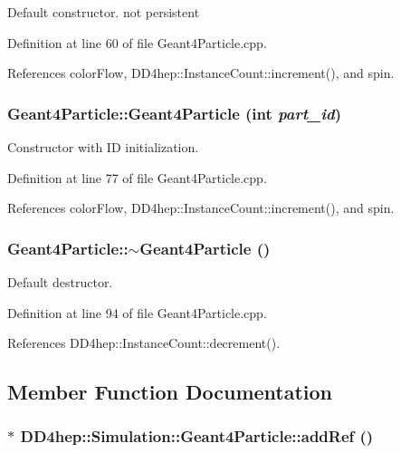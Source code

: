 Default constructor. not persistent 

Definition at line 60 of file Geant4Particle.cpp.

References colorFlow, DD4hep::InstanceCount::increment(), and spin.\hypertarget{class_d_d4hep_1_1_simulation_1_1_geant4_particle_a3fedeb9cf8f88104e7457305164145d8}{
\subsubsection[{Geant4Particle}]{\setlength{\rightskip}{0pt plus 5cm}Geant4Particle::Geant4Particle (int {\em part\_\-id})}}
\label{class_d_d4hep_1_1_simulation_1_1_geant4_particle_a3fedeb9cf8f88104e7457305164145d8}


Constructor with ID initialization. 

Definition at line 77 of file Geant4Particle.cpp.

References colorFlow, DD4hep::InstanceCount::increment(), and spin.\hypertarget{class_d_d4hep_1_1_simulation_1_1_geant4_particle_a6826af4b7518aeb0e2396eb7abaed67c}{
\subsubsection[{$\sim$Geant4Particle}]{\setlength{\rightskip}{0pt plus 5cm}Geant4Particle::$\sim$Geant4Particle ()}}
\label{class_d_d4hep_1_1_simulation_1_1_geant4_particle_a6826af4b7518aeb0e2396eb7abaed67c}


Default destructor. 

Definition at line 94 of file Geant4Particle.cpp.

References DD4hep::InstanceCount::decrement().

\subsection{Member Function Documentation}
\hypertarget{class_d_d4hep_1_1_simulation_1_1_geant4_particle_a57fda35759c8768450ef1c7d5509c281}{
\subsubsection[{addRef}]{$\ast$ DD4hep::Simulation::Geant4Particle::addRef ()}}
\label{class_d_d4hep_1_1_simulation_1_1_geant4_particle_a57fda35759c8768450ef1c7d5509c281}


